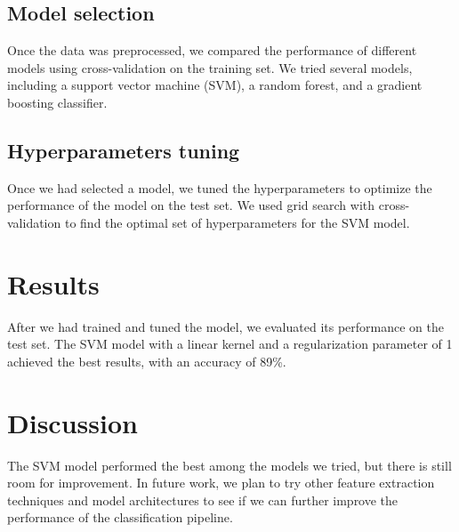 \documentclass[conference]{IEEEtran}
\begin{document}
\subsection{Model selection}
Once the data was preprocessed, we compared the performance of different models using cross-validation on the training set. We tried several models, including a support vector machine (SVM), a random forest, and a gradient boosting classifier.

\subsection{Hyperparameters tuning}
Once we had selected a model, we tuned the hyperparameters to optimize the performance of the model on the test set. We used grid search with cross-validation to find the optimal set of hyperparameters for the SVM model.

\section{Results}
After we had trained and tuned the model, we evaluated its performance on the test set. The SVM model with a linear kernel and a regularization parameter of 1 achieved the best results, with an accuracy of 89\%.

\section{Discussion}
The SVM model performed the best among the models we tried, but there is still room for improvement. In future work, we plan to try other feature extraction techniques and model architectures to see if we can further improve the performance of the classification pipeline.

\nocite{*}


\end{document}

